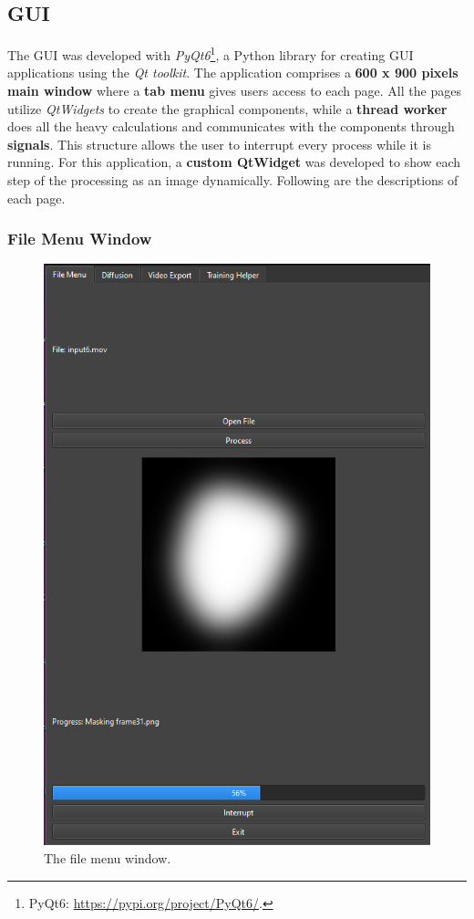 \documentclass[preprint]{elsarticle}
\begin{document}
\subsection{GUI}\label{sec:gui}

The GUI was developed with \emph{PyQt6}\footnote{PyQt6: \url{https://pypi.org/project/PyQt6/}.}, 
a Python library for creating GUI applications using the \emph{Qt toolkit}.  The application comprises a \textbf{600 x 900 pixels main window} where a \textbf{tab menu} gives users access to each page.
All the pages utilize \emph{QtWidgets} to create the graphical components,  while a \textbf{thread worker} does all the heavy calculations and communicates  with the components through \textbf{signals}. 
This structure allows the user to interrupt every process while it is running.
For this application, a \textbf{custom QtWidget} was developed to show each step of the processing as an image dynamically. Following are the descriptions of each page.



\subsubsection{File Menu Window}

\begin{figure}[H]
	\centering
	\includegraphics[scale=0.5, keepaspectratio]{img/project_img/file-window.png}
	\caption{The file menu window.}
	\label{fig:file-menu}
\end{figure}
\end{document}
